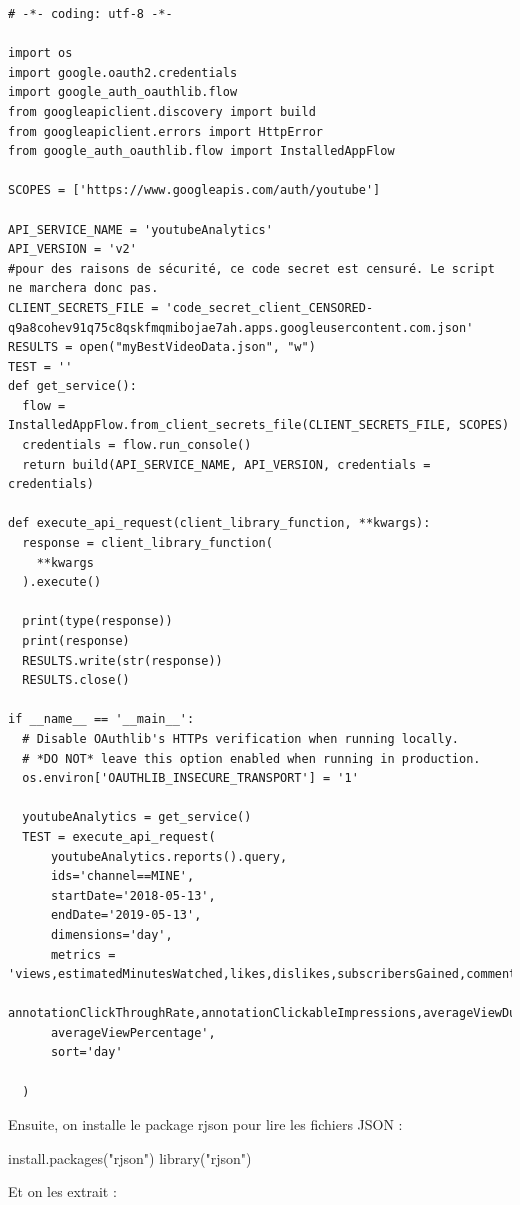 \begin{verbatim}
# -*- coding: utf-8 -*-

import os
import google.oauth2.credentials
import google_auth_oauthlib.flow
from googleapiclient.discovery import build
from googleapiclient.errors import HttpError
from google_auth_oauthlib.flow import InstalledAppFlow

SCOPES = ['https://www.googleapis.com/auth/youtube']

API_SERVICE_NAME = 'youtubeAnalytics'
API_VERSION = 'v2'
#pour des raisons de sécurité, ce code secret est censuré. Le script ne marchera donc pas.
CLIENT_SECRETS_FILE = 'code_secret_client_CENSORED-q9a8cohev91q75c8qskfmqmibojae7ah.apps.googleusercontent.com.json' 
RESULTS = open("myBestVideoData.json", "w")
TEST = ''
def get_service():
  flow = InstalledAppFlow.from_client_secrets_file(CLIENT_SECRETS_FILE, SCOPES)
  credentials = flow.run_console()
  return build(API_SERVICE_NAME, API_VERSION, credentials = credentials)

def execute_api_request(client_library_function, **kwargs):
  response = client_library_function(
    **kwargs
  ).execute()

  print(type(response))
  print(response)
  RESULTS.write(str(response))
  RESULTS.close()

if __name__ == '__main__':
  # Disable OAuthlib's HTTPs verification when running locally.
  # *DO NOT* leave this option enabled when running in production.
  os.environ['OAUTHLIB_INSECURE_TRANSPORT'] = '1'

  youtubeAnalytics = get_service()
  TEST = execute_api_request(
      youtubeAnalytics.reports().query,
      ids='channel==MINE',
      startDate='2018-05-13',
      endDate='2019-05-13',
      dimensions='day',
      metrics = 'views,estimatedMinutesWatched,likes,dislikes,subscribersGained,comments,shares,
      annotationClickThroughRate,annotationClickableImpressions,averageViewDuration,
      averageViewPercentage',
      sort='day'

  )
\end{verbatim}

Ensuite, on installe le package rjson pour lire les fichiers JSON :

\begin{Schunk}
\begin{Sinput}
install.packages("rjson")
library("rjson")
\end{Sinput}
\end{Schunk}

Et on les extrait :

